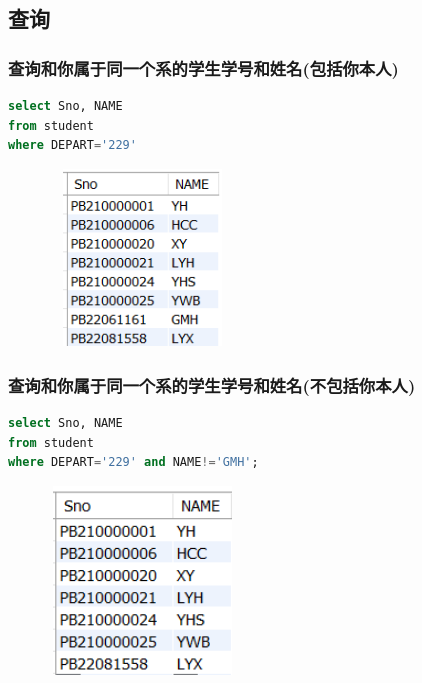 \documentclass{ctexart}
\begin{document}
\subsection{查询}
\subsubsection{查询和你属于同一个系的学生学号和姓名(包括你本人)}
\begin{lstlisting}[language=sql]
select Sno, NAME
from student
where DEPART='229'
\end{lstlisting}
\begin{figure}[H]
	\centering 
	\includegraphics[height=4.7cm,width=5cm]{23.png}
	\end{figure}
\subsubsection{查询和你属于同一个系的学生学号和姓名(不包括你本人)}
\begin{lstlisting}[language=sql]
select Sno, NAME
from student
where DEPART='229' and NAME!='GMH';
\end{lstlisting}
\begin{figure}[H]
	\centering 
	\includegraphics[height=5cm,width=5cm]{24.png}
	\end{figure}
\end{document}
